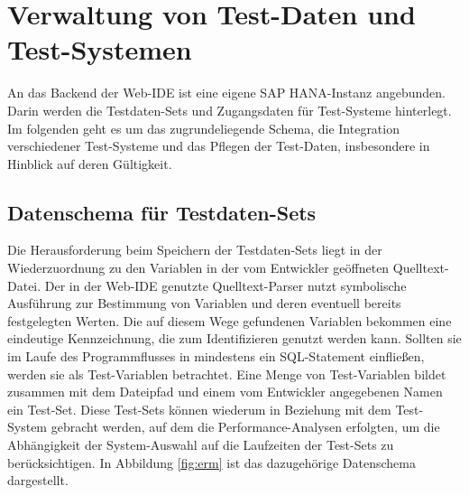 \section{Verwaltung von Test-Daten und Test-Systemen}\label{chap:testdataadministration}

%
%

An das Backend der Web-IDE ist eine eigene SAP HANA-Instanz angebunden.
Darin werden die Testdaten-Sets und Zugangsdaten für Test-Systeme hinterlegt.
Im folgenden geht es um das zugrundeliegende Schema, die Integration verschiedener Test-Systeme und das Pflegen der Test-Daten, insbesondere in Hinblick auf deren Gültigkeit.

\subsection{Datenschema für Testdaten-Sets}
Die Herausforderung beim Speichern der Testdaten-Sets liegt in der Wiederzuordnung zu den Variablen in der vom Entwickler geöffneten Quelltext-Datei.
Der in der Web-IDE genutzte Quelltext-Parser \cite{Horschig2014} nutzt symbolische Ausführung \cite{DBLP:journals/cacm/King76} zur Bestimmung von Variablen und deren eventuell bereits festgelegten Werten.
Die auf diesem Wege gefundenen Variablen bekommen eine eindeutige Kennzeichnung, die zum Identifizieren genutzt werden kann.
Sollten sie im Laufe des Programmflusses in mindestens ein SQL-Statement einfließen, werden sie als Test-Variablen betrachtet.
Eine Menge von Test-Variablen bildet zusammen mit dem Dateipfad und einem vom Entwickler angegebenen Namen ein Test-Set.
Diese Test-Sets können wiederum in Beziehung mit dem Test-System gebracht werden, auf dem die Performance-Analysen erfolgten, um die Abhängigkeit der System-Auswahl auf die Laufzeiten der Test-Sets zu berücksichtigen.
In Abbildung \ref{fig:erm} ist das dazugehörige Datenschema dargestellt.

\newcommand {\key}[1]{\underline{#1}}

